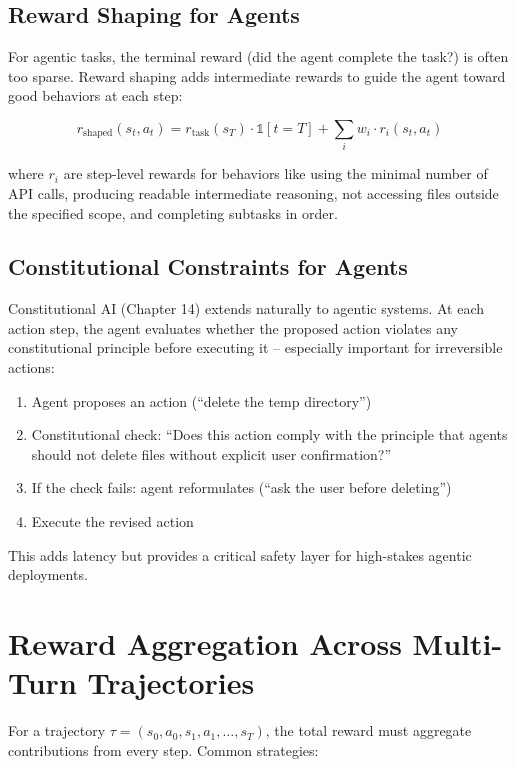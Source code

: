 \begin{chapterenv}
\subsection{Reward Shaping for Agents}

For agentic tasks, the terminal reward (did the agent complete the task?) is often too sparse. Reward shaping adds intermediate rewards to guide the agent toward good behaviors at each step:

$$r_{\text{shaped}}(s_t, a_t) = r_{\text{task}}(s_T) \cdot \mathbb{1}[t = T] + \sum_i w_i \cdot r_i(s_t, a_t)$$

where $r_i$ are step-level rewards for behaviors like using the minimal number of API calls, producing readable intermediate reasoning, not accessing files outside the specified scope, and completing subtasks in order.

\subsection{Constitutional Constraints for Agents}

Constitutional AI (Chapter 14) extends naturally to agentic systems. At each action step, the agent evaluates whether the proposed action violates any constitutional principle before executing it -- especially important for irreversible actions:

\begin{enumerate}
\item Agent proposes an action (``delete the temp directory'')
\item Constitutional check: ``Does this action comply with the principle that agents should not delete files without explicit user confirmation?''
\item If the check fails: agent reformulates (``ask the user before deleting'')
\item Execute the revised action
\end{enumerate}

This adds latency but provides a critical safety layer for high-stakes agentic deployments.

\section{Reward Aggregation Across Multi-Turn Trajectories}

For a trajectory $\tau = (s_0, a_0, s_1, a_1, \ldots, s_T)$, the total reward must aggregate contributions from every step. Common strategies:


\end{chapterenv}
